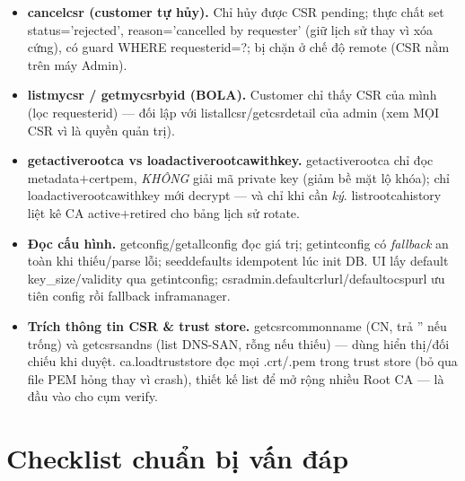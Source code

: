 \documentclass[12pt,a4paper]{article}
\newcommand{\code}[1]{{\ttfamily\small\def\_{\textunderscore\discretionary{}{}{}}#1}}
\begin{document}
\begin{itemize}
  \item \textbf{\code{cancel\_csr} (customer tự hủy).} Chỉ hủy được CSR \code{pending};
        thực chất set \code{status='rejected'}, \code{reason='cancelled by requester'}
        (giữ lịch sử thay vì xóa cứng), có guard \code{WHERE requester\_id=?}; bị
        chặn ở chế độ remote (CSR nằm trên máy Admin).
  \item \textbf{\code{list\_my\_csr} / \code{get\_my\_csr\_by\_id} (BOLA).} Customer chỉ
        thấy CSR của mình (lọc \code{requester\_id}) --- đối lập với
        \code{list\_all\_csr}/\code{get\_csr\_detail} của admin (xem MỌI CSR vì là
        quyền quản trị).
  \item \textbf{\code{get\_active\_root\_ca} vs \code{load\_active\_root\_ca\_with\_key}.}
        \code{get\_active\_root\_ca} chỉ đọc metadata$+$\code{cert\_pem},
        \emph{KHÔNG} giải mã private key (giảm bề mặt lộ khóa); chỉ
        \code{load\_active\_root\_ca\_with\_key} mới decrypt --- và chỉ khi cần
        \emph{ký}. \code{list\_root\_ca\_history} liệt kê CA active$+$retired cho bảng
        lịch sử rotate.
  \item \textbf{Đọc cấu hình.} \code{get\_config}/\code{get\_all\_config} đọc giá trị;
        \code{get\_int\_config} có \emph{fallback} an toàn khi thiếu/parse lỗi;
        \code{seed\_defaults} idempotent lúc init DB. UI lấy default key\_size/validity
        qua \code{get\_int\_config}; \code{csr\_admin.\_default\_crl\_url}/\code{\_default\_ocsp\_url}
        ưu tiên config rồi fallback \code{infra\_manager}.
  \item \textbf{Trích thông tin CSR \& trust store.} \code{get\_csr\_common\_name}
        (CN, trả '' nếu trống) và \code{get\_csr\_san\_dns} (list DNS-SAN, rỗng nếu
        thiếu) --- dùng hiển thị/đối chiếu khi duyệt. \code{ca.load\_trust\_store}
        đọc mọi \code{.crt}/\code{.pem} trong trust store (bỏ qua file PEM hỏng thay
        vì crash), thiết kế list để mở rộng nhiều Root CA --- là đầu vào cho cụm verify.
\end{itemize}

\section{Checklist chuẩn bị vấn đáp}
\end{document}
